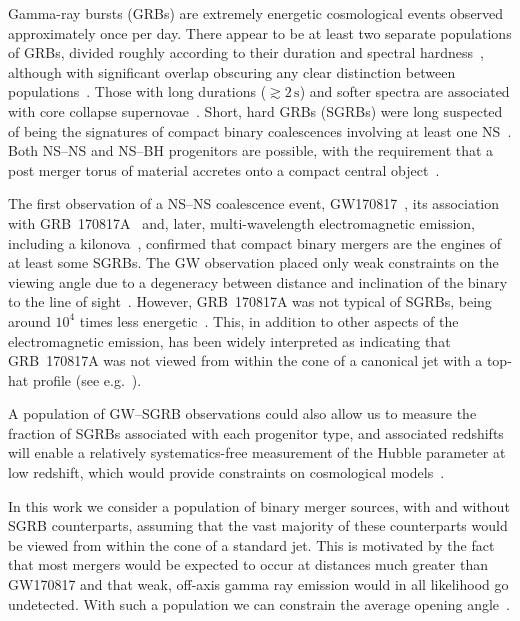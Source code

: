 \documentclass[twocolumn]{aastex61}
\newcommand{\BNS}{\ac{NS}--\ac{NS}\xspace}
\newcommand{\NSBH}{\ac{NS}--\ac{BH}\xspace}
\newcommand{\JOINT}{\ac{GW}--\ac{SGRB}\xspace}
\begin{document}
Gamma-ray bursts (GRBs) are extremely energetic cosmological events
observed approximately once per day. There appear to be at least two separate
populations of \acp{GRB}, divided roughly according to their duration and
spectral hardness~\cite{Kouveliotou:1993yx}, although with significant overlap
obscuring any clear distinction between
populations~\cite{Zhang:2009uf,Bromberg:2012gp}.
Those with long durations ($\gtrsim 2\,\mathrm{s}$) and softer spectra are associated
with core collapse
supernovae~\cite{Galama:1998ea,MacFadyen:1998vz,Woosley:2006fn}. Short, hard
\acp{GRB} (SGRBs) were long suspected of being the signatures of
compact binary coalescences involving at least one
\ac{NS}~\cite{Blinnikov1984,Eichler:1989ve,Paczynski:1991aq,Narayan:1992iy,Lee:2007js}.
Both \BNS and \NSBH progenitors are possible, with the requirement that a post
merger torus of material accretes onto a compact central
object~\cite{Blandford:1977ds,Rosswog:2002rt,Giacomazzo:2012zt}.

The first observation of a \BNS coalescence event,
GW170817~\cite{TheLIGOScientific:2017qsa}, its association with
GRB~170817A~\cite{Monitor:2017mdv,Goldstein:2017mmi,Savchenko:2017ffs}
and, later, multi-wavelength electromagnetic emission, including a
kilonova~\cite{2017ApJ...848L..12A}, confirmed that compact binary mergers are
the engines of at least some \acp{SGRB}. The \ac{GW} observation placed only
weak constraints on the viewing angle due to a degeneracy between distance and
inclination of the binary to the line of sight~\cite{TheLIGOScientific:2017qsa}.
However, GRB~170817A was not typical of \acp{SGRB}, being around $10^{4}$ times
less energetic~\cite{Goldstein:2017mmi}. This, in addition to other aspects of
the electromagnetic emission, has been widely interpreted as indicating that
GRB~170817A was not viewed from within the cone of a canonical jet with a
top-hat profile (see
e.g.~\cite{Fong:2017ekk,Kasliwal:2017ngb,Gottlieb:2017pju,Haggard:2017qne}).

A population of \JOINT observations could also allow us to measure the fraction
of \acp{SGRB} associated with each progenitor type, and associated redshifts
will enable a relatively systematics-free measurement of the Hubble parameter
at low redshift, which would provide constraints on cosmological
models~\cite{Schutz:1986gp,Nissanke:2009kt,Chen:2012qh,Abbott:2017xzu}.

In this work we consider a population of binary merger sources, with and without
\ac{SGRB} counterparts, assuming that the vast majority of these counterparts
would be viewed from within the cone of a standard jet. This is motivated by the
fact that most mergers would be expected to occur at distances much greater than
GW170817 and that weak, off-axis gamma ray emission would in all likelihood go
undetected. With such a population we can constrain the average opening
angle~\cite{Chen:2012qh,Clark:2014jpa,Abbott:2016ymx}.
\end{document}
